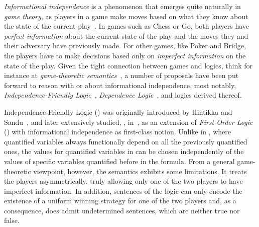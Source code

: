 \documentclass[bsl, meeting, bibother]{asl}
\begin{document}
  \thispagestyle{empty}

  \vspace{0.5em}

  \emph{Informational independence} is a phenomenon that emerges quite naturally
  in \emph{game theory}, as players in a game make moves based on what they know
  about the state of the current play~\cite{NM44}.
  In games such as Chess or Go, both players have \emph{perfect information}
  about the current state of the play and the moves they and their adversary
  have previously made.
  For other games, like Poker and Bridge, the players have to make decisions
  based only on \emph{imperfect information} on the state of the play.
  Given the tight connection between games and logics, think for instance at
  \emph{game-theoretic semantics}~\cite{Lor61,Lor68,Hin73}, a number of
  proposals have been put forward to reason with or about informational
  independence, most notably, \emph{Independence-Friendly Logic}~\cite{HS89},
  \emph{Dependence Logic}~\cite{Vaa07}, and logics derived thereof.

  Independence-Friendly Logic (\IF) was originally introduced by Hintikka and
  Sandu~\cite{HS89}, and later extensively studied, \eg, in~\cite{MSS11}, as an
  extension of \emph{First-Order Logic} (\FOL) with informational independence
  as first-class notion.
  Unlike in \FOL, where quantified variables always functionally depend on all
  the previously quantified ones, the values for quantified variables in \IF can
  be chosen independently of the values of specific variables quantified before
  in the formula.
  From a general game-theoretic viewpoint, however, the \IF semantics exhibits
  some limitations.
  It treats the players asymmetrically, truly allowing only one of the two
  players to have imperfect information. In addition, sentences of the logic can
  only encode the existence of a uniform winning strategy for one of the two
  players and, as a consequence, \IF does admit undetermined sentences, which
  are neither true nor false.
\end{document}
